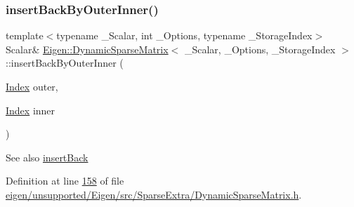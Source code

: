 \mbox{\label{class_eigen_1_1_dynamic_sparse_matrix_ac97c2463058ae55d7f0ef21c851eb5f3}} 
\subsubsection{\texorpdfstring{insert\+Back\+By\+Outer\+Inner()}{insertBackByOuterInner()}\hspace{0.1cm}{\footnotesize\ttfamily [2/2]}}
{\footnotesize\ttfamily template$<$typename \+\_\+\+Scalar, int \+\_\+\+Options, typename \+\_\+\+Storage\+Index$>$ \\
Scalar\& \hyperlink{class_eigen_1_1_dynamic_sparse_matrix}{Eigen\+::\+Dynamic\+Sparse\+Matrix}$<$ \+\_\+\+Scalar, \+\_\+\+Options, \+\_\+\+Storage\+Index $>$\+::insert\+Back\+By\+Outer\+Inner (\begin{DoxyParamCaption}\item[{\hyperlink{group___core___module_a554f30542cc2316add4b1ea0a492ff02}{Index}}]{outer,  }\item[{\hyperlink{group___core___module_a554f30542cc2316add4b1ea0a492ff02}{Index}}]{inner }\end{DoxyParamCaption})\hspace{0.3cm}{\ttfamily [inline]}}

\begin{DoxySeeAlso}{See also}
\hyperlink{class_eigen_1_1_dynamic_sparse_matrix_a0a556652195b91c09e9f6c4d8b7cc81d}{insert\+Back} 
\end{DoxySeeAlso}


Definition at line \hyperlink{eigen_2unsupported_2_eigen_2src_2_sparse_extra_2_dynamic_sparse_matrix_8h_source_l00158}{158} of file \hyperlink{eigen_2unsupported_2_eigen_2src_2_sparse_extra_2_dynamic_sparse_matrix_8h_source}{eigen/unsupported/\+Eigen/src/\+Sparse\+Extra/\+Dynamic\+Sparse\+Matrix.\+h}.

\mbox{\label{class_eigen_1_1_dynamic_sparse_matrix_a473cd00ddc0319327f4c8a6c82ec96cf}} 
